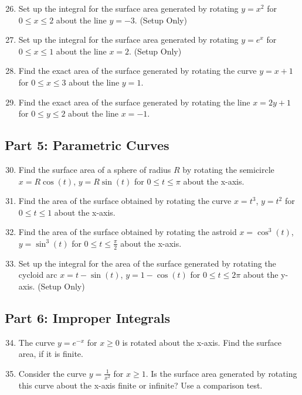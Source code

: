 \documentclass[12pt]{article}
\begin{document}
\begin{enumerate}
    \setcounter{enumi}{25}
    \item Set up the integral for the surface area generated by rotating $y = x^2$ for $0 \le x \le 2$ about the line $y = -3$. (Setup Only)

    \item Set up the integral for the surface area generated by rotating $y = e^x$ for $0 \le x \le 1$ about the line $x = 2$. (Setup Only)

    \item Find the exact area of the surface generated by rotating the curve $y = x+1$ for $0 \le x \le 3$ about the line $y=1$.

    \item Find the exact area of the surface generated by rotating the line $x=2y+1$ for $0 \le y \le 2$ about the line $x=-1$.
\end{enumerate}

\subsection*{Part 5: Parametric Curves}

\begin{enumerate}
    \setcounter{enumi}{29}
    \item Find the surface area of a sphere of radius $R$ by rotating the semicircle $x = R\cos(t)$, $y = R\sin(t)$ for $0 \le t \le \pi$ about the x-axis.

    \item Find the area of the surface obtained by rotating the curve $x=t^3$, $y=t^2$ for $0 \le t \le 1$ about the x-axis.

    \item Find the area of the surface obtained by rotating the astroid $x = \cos^3(t)$, $y = \sin^3(t)$ for $0 \le t \le \frac{\pi}{2}$ about the x-axis.

    \item Set up the integral for the area of the surface generated by rotating the cycloid arc $x = t - \sin(t)$, $y = 1 - \cos(t)$ for $0 \le t \le 2\pi$ about the y-axis. (Setup Only)
\end{enumerate}

\subsection*{Part 6: Improper Integrals}

\begin{enumerate}
    \setcounter{enumi}{33}
    \item The curve $y = e^{-x}$ for $x \ge 0$ is rotated about the x-axis. Find the surface area, if it is finite.

    \item Consider the curve $y = \frac{1}{x^2}$ for $x \ge 1$. Is the surface area generated by rotating this curve about the x-axis finite or infinite? Use a comparison test.
\end{enumerate}
\end{document}
